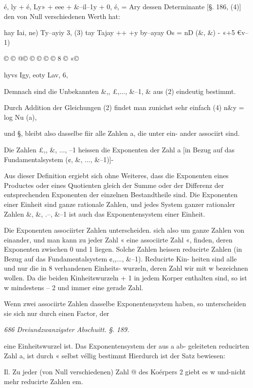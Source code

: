 \documentclass[12pt,a4paper]{article}
\theoremstyle{plain}
\theoremstyle{definition}
\begin{document}
é, ly + é, Ly» + eee + \&--il--1y + 0, é, = Ary dessen Determinante [§. 186, (4)] den von Null verschiedenen Werth hat:

hay Iai, ne) Ty--ayiy 3, (3) tay Tajay ++ +y by--ayay Os = nD (\&, \&) - «+5 €v--1)

© © @© © © © © 8 © «©

hyvs Igy, eoty Lav, 6,

Demnach sind die Unbekannten \&,, £,..., \&--1, \& aus (2) eindeutig bestimmt.

Durch Addition der Gleichungen (2) findet man zunichst sehr einfach (4) n\&y = log Nu (a),

und §, bleibt also dasselbe fiir alle Zahlen a, die unter ein- ander associirt sind.

Die Zahlen £,, \&, ..., --1 heissen die Exponenten der Zahl a [in Bezug auf das Fundamentalsystem (¢, \&, ..., \&--1)]-

Aus dieser Definition ergiebt sich ohne Weiteres, dass die Exponenten eines Productes oder eines Quotienten gleich der Summe oder der Differenz der entsprechenden Exponenten der einzelnen Bestandtheile sind. Die Exponenten einer Einheit sind ganze rationale Zahlen, und jedes System ganzer rationaler Zahlen \&, \&, .--, \&--1 ist auch das Exponentensystem einer Einheit.

Die Exponenten associirter Zahlen unterscheiden. sich also um ganze Zahlen von einander, und man kann zu jeder Zahl « eine associirte Zahl «, finden, deren Exponenten zwischen 0 und 1 liegen. Solche Zahlen heissen reducirte Zahlen (in Bezug auf das Fundamentalsystem ¢,,..., \&--1). Reducirte Kin- heiten sind alle und nur die in 8 verhandenen Einheits- wurzeln, deren Zahl wir mit w bezeichnen wollen. Da die beiden Kinheitswurzeln + 1 in jedem Korper enthalten sind, so ist w mindestens -- 2 und immer eine gerade Zahl.

Wenn zwei associirte Zahlen dasselbe Exponentensystem haben, so unterscheiden sie sich nur durch einen Factor, der

\vspace{0.5\baselineskip}\noindent\textit{686 Dreiundzwanzigster Abschuitt. §. 189.}\par

eine Einheitswurzel ist. Das Exponentensystem der aus a ab- geleiteten reducirten Zahl a, ist durch « selbst véllig bestimmt Hierdurch ist der Satz bewiesen:

Il. Zu jeder (von Null verschiedenen) Zahl @ des Koérpers 2 giebt es w und-nicht mehr reducirte Zahlen em.
\end{document}
